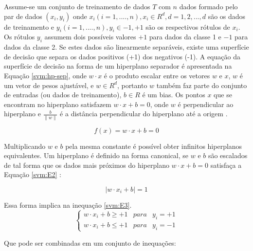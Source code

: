 Assume-se um conjunto de treinamento de dados $T$ com $n$ dados formado pelo par de dados $(x_{i},y_{i})$ onde $x_{i} (i = 1,....,n ), x_{i} \in R^{d}, d = 1,2,...,d $  são os dados de treinamento e $y_{i} (i = 1,....,n), y_{i} \in {-1,+1}$ são os respectivos rótulos de $x_{i}$. Os rótulos $y_{i}$ assumem dois possíveis valores $+1$ para dados da classe 1 e $-1$ para dados da classe 2. Se estes dados são linearmente separáveis, existe uma superfície de decisão que separa os dados positivos (+1) dos negativos (-1). A equação da superfície de decisão na forma de um hiperplano separador é apresentada na Equação \ref{svm:hp-sep}, onde $w\cdot x$ é o produto escalar entre os vetores $w$ e $x$, $w$ é um vetor de pesos ajustável, e $w \in R^{d}$, portanto $w$ também faz parte do conjunto de entradas (ou dados de treinamento), $b \in R$ é um bias. Os pontos $x$ que se encontram no hiperplano satisfazem $w\cdot x + b = 0$, onde $w$ é perpendicular ao hiperplano e $ \frac{b}{\parallel w \parallel}$ é a distância perpendicular do hiperplano até a origem \cite{Burges1998Support}.

\begin{equation} \label{svm:hp-sep}
	f(x) = w\cdot x + b = 0
\end{equation}

Multiplicando $w$ e $b$ pela mesma constante é possível obter infinitos hiperplanos equivalentes. Um hiperplano é definido na forma canonical, se $w$ e $b$ são escalados de tal forma que os dados mais próximos do hiperplano $w\cdot x + b = 0$ satisfaça a Equação \ref{svm:E2} \cite{Scholkopf2002}:

\begin{equation} \label{svm:E2}
	\mid w\cdot x_{i} + b\mid = 1
\end{equation}
 
Essa forma implica na inequação \ref{svm:E3}.
\begin{equation} \label{svm:E3}
\left\{\begin{matrix}
w \cdot x_{i}+b \geq + 1 & para & y_{i} = +1 \\ 
w \cdot x_{i}+b \leq + 1 & para & y_{i} = -1
\end{matrix}\right.
\end{equation}

Que pode ser combinadas em um conjunto de inequações:

